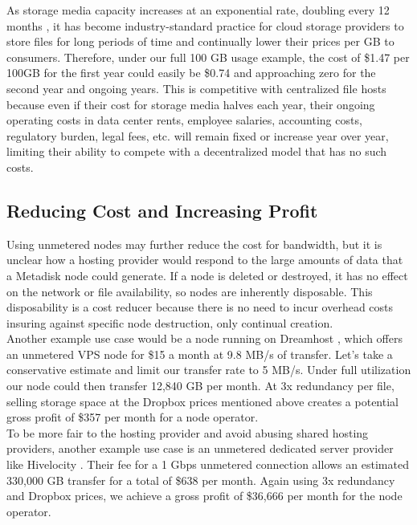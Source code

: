 \documentclass[a4paper,10pt]{article}
\begin{document}
As storage media capacity increases at an exponential rate, doubling every 12 months \cite{17}, it has become industry-standard practice for cloud storage providers to store files for long periods of time and continually lower their prices per GB to consumers. Therefore, under our full 100 GB usage example, the cost of \$1.47 per 100GB for the first year could easily be \$0.74 and approaching zero for the second year and ongoing years. This is competitive with centralized file hosts because even if their cost for storage media halves each year, their ongoing operating costs in data center rents, employee salaries, accounting costs, regulatory burden, legal fees, etc. will remain fixed or increase year over year, limiting their ability to compete with a decentralized model that has no such costs.

\subsection*{Reducing Cost and Increasing Profit}

Using unmetered nodes may further reduce the cost for bandwidth, but it is unclear how a hosting provider would respond to the large amounts of data that a Metadisk node could generate. If a node is deleted or destroyed, it has no effect on the network or file availability, so nodes are inherently disposable. This disposability is a cost reducer because there is no need to incur overhead costs insuring against specific node destruction, only continual creation. \\

Another example use case would be a node running on Dreamhost \cite{9}, which offers an unmetered VPS node for \$15 a month at 9.8 MB/s of transfer. Let’s take a conservative estimate and limit our transfer rate to 5 MB/s. Under full utilization our node could then transfer 12,840 GB per month. At 3x redundancy per file, selling storage space at the Dropbox prices mentioned above creates a potential gross profit of \$357 per month for a node operator. \\

To be more fair to the hosting provider and avoid abusing shared hosting providers, another example use case is an unmetered dedicated server provider like Hivelocity \cite{10}.  Their fee for a 1 Gbps unmetered connection allows an estimated 330,000 GB transfer for a total of \$638 per month. Again using 3x redundancy and Dropbox prices, we achieve a gross profit of \$36,666 per month for the node operator. 
\end{document}
